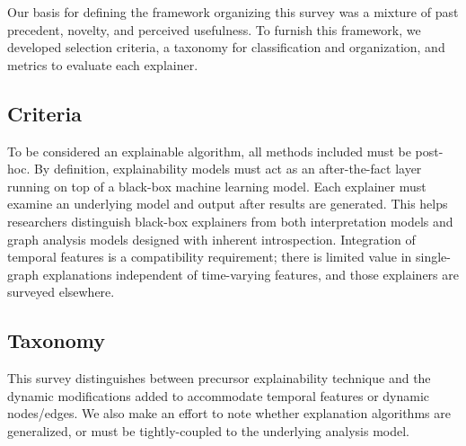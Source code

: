 Our basis for defining the framework organizing this survey was a mixture of past precedent, novelty, and perceived usefulness. To furnish this framework, we developed selection criteria, a taxonomy for classification and organization, and metrics to evaluate each explainer.

\subsection{Criteria}
To be considered an explainable algorithm, all methods included must be post-hoc. By definition, explainability models must act as an after-the-fact layer running on top of a black-box machine learning model. Each explainer must examine an underlying model and output after results are generated. This helps researchers distinguish black-box explainers from both interpretation models and graph analysis models designed with inherent introspection. Integration of temporal features is a compatibility requirement; there is limited value in single-graph explanations independent of time-varying features, and those explainers are surveyed elsewhere.

\subsection{Taxonomy}
This survey distinguishes between precursor explainability technique and the dynamic modifications added to accommodate temporal features or dynamic nodes/edges. We also make an effort to note whether explanation algorithms are generalized, or must be tightly-coupled to the underlying analysis model.